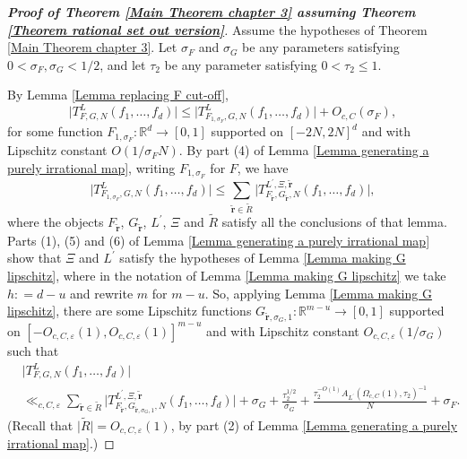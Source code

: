 \documentclass[12pt,a4paper,twoside,reqno]{amsart}
\numberwithin{equation}{section}
\begin{document}
\begin{proof}[\textbf{Proof of Theorem \ref{Main Theorem chapter 3} assuming Theorem \ref{Theorem rational set out version}}]
Assume the hypotheses of Theorem \ref{Main Theorem chapter 3}. Let $\sigma_F$ and $\sigma_G$ be any parameters satisfying $0<\sigma_F,\sigma_G<1/2$, and let $\tau_2$ be any parameter satisfying $0<\tau_2\leqslant 1$. 

By Lemma \ref{Lemma replacing F cut-off}, \[\vert T_{F,G,N}^L(f_1,\dots,f_d)\vert \leqslant \vert T_{F_{1,\sigma_F},G,N}^L(f_1,\dots,f_d)\vert + O_{c,C}(\sigma_F),\] for some function $F_{1,\sigma_F}:\mathbb{R}^{d} \longrightarrow [0,1]$ supported on $[-2N,2N]^d$ and with Lipschitz constant $O(1/\sigma_F N)$. By part (4) of Lemma \ref{Lemma generating a purely irrational map}, writing $F_{1,\sigma_F}$ for $F$, we have \[\vert T_{F_{1,\sigma_F},G,N}^L(f_1,\dots,f_d)\vert  \leqslant \sum\limits_{\widetilde{\mathbf{r}} \in \widetilde{R}}\vert T_{F_{\widetilde{\mathbf{r}}},G_{\widetilde{\mathbf{r}}},N}^{L^\prime,\Xi,\widetilde{\mathbf{r}}}(f_1,\dots,f_d)\vert, \] where the objects $F_{\widetilde{\mathbf{r}}}$, $G_{\widetilde{\mathbf{r}}}$, $L^\prime$, $\Xi$ and $\widetilde{R}$ satisfy all the conclusions of that lemma. \\


 Parts (1), (5) and (6) of Lemma \ref{Lemma generating a purely irrational map} show that $\Xi$ and $L^\prime$ satisfy the hypotheses of Lemma \ref{Lemma making G lipschitz}, where in the notation of Lemma \ref{Lemma making G lipschitz} we take $h: = d-u$ and rewrite $m$ for $m-u$. So, applying Lemma \ref{Lemma making G lipschitz}, there are some Lipschitz functions $G_{\widetilde{\mathbf{r}},\sigma_G,1}:\mathbb{R}^{m-u} \longrightarrow [0,1]$ supported on $[-O_{c,C,\varepsilon}(1),O_{c,C,\varepsilon}(1)]^{m-u}$ and with Lipschitz constant $O_{c,C,\varepsilon}(1/\sigma_G)$ such that 
\begin{align}
&\vert T_{F,G,N}^L(f_1,\dots,f_d)\vert \nonumber \\
&\ll_{c,C,\varepsilon}  \sum\limits_{\widetilde{\mathbf{r}} \in \widetilde{R}}\vert T_{F_{\widetilde{\mathbf{r}}},G_{\widetilde{\mathbf{r}},\sigma_G,1},N}^{L^\prime,\Xi,\widetilde{\mathbf{r}}}(f_1,\dots,f_d)\vert + \sigma_G + \frac{\tau_2^{1/2}}{\sigma _G} +  \frac{\tau_2^{-O(1)}A_{L^\prime}(\Omega_{c,C}(1),\tau_2)^{-1}}{N} + \sigma_F.
\end{align}
\noindent (Recall that $\vert \widetilde{R}\vert = O_{c,C,\varepsilon}(1)$, by part (2) of Lemma \ref{Lemma generating a purely irrational map}.)


\end{proof}
\end{document}

